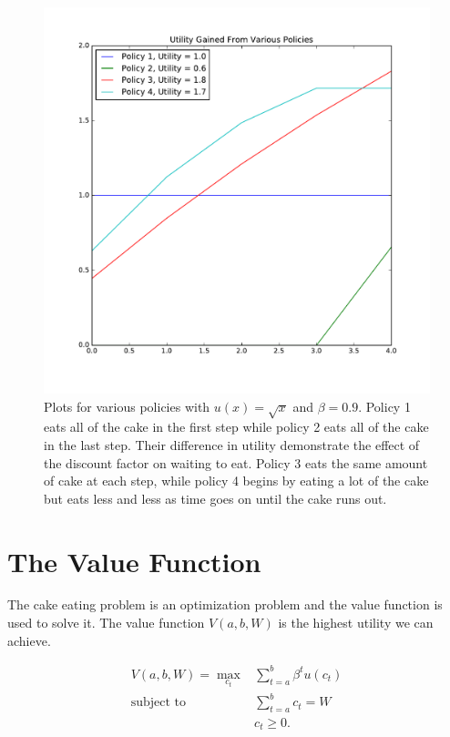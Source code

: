 \begin{figure}[H]
\includegraphics[width=\textwidth]{figures/diff_policies.pdf}
\caption{Plots for various policies with $u(x) = \sqrt{x}$ and $\beta = 0.9$.
Policy 1 eats all of the cake in the first step while policy 2 eats all of the cake in the last step.
Their difference in utility demonstrate the effect of the discount factor on waiting to eat.
Policy 3 eats the same amount of cake at each step, while policy 4 begins by eating a lot of the cake but eats less and less as time goes on until the cake runs out.}
\label{fig:diff_pols}
\end{figure}

\section*{The Value Function}

The cake eating problem is an optimization problem and the value function is used to solve it.
The value function $V(a,b,W)$ is the highest utility we can achieve.

\begin{align*}
V(a,b,W) = \max_{c_t} & \sum_{t=a}^b \beta^tu(c_t) \\
\mbox{subject to } & \sum_{t=a}^b c_t = W \\
& c_t \geq 0.
\end{align*}

